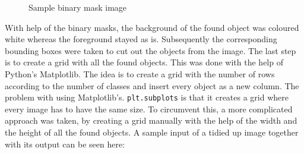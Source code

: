 \begin{figure}[H]
	\caption{\label{fig:binary-mask} Sample binary mask image}
\end{figure}

With help of the binary masks, the background of the found object was coloured white whereas the foreground stayed as is. Subsequently the corresponding bounding boxes were taken to cut out the objects from the image. The last step is to create a grid with all the found objects. This was done with the help of Python's Matplotlib. The idea is to create a grid with the number of rows according to the number of classes and insert every object as a new column. The problem with using Matplotlib's. \texttt{plt.subplots} is that it creates a grid where every image has to have the same size. To circumvent this, a more complicated approach was taken, by creating a grid manually with the help of the width and the height of all the found objects. A sample input of a tidied up image together with its output can be seen here:

